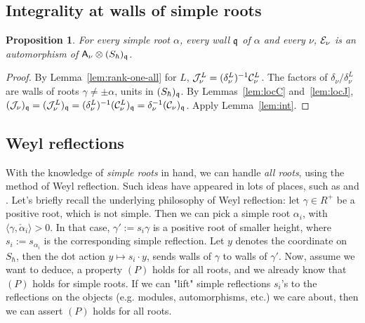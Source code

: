 \documentclass{article}
\theoremstyle{plain}
\newtheorem{proposition}[theorem]{Proposition}
\theoremstyle{definition}
\theoremstyle{remark}
\numberwithin{equation}{section}
\begin{document}
\subsection*{Integrality at walls of simple roots}
\begin{proposition}\label{prop:simple-walls}
For every simple root $\alpha$, every wall $\mathfrak q$ of $\alpha$ and every $\nu$, $\mathcal E_\nu$ is an automorphism of $\mathsf A_\nu\otimes(S_\hbar)_\mathfrak q$.
\end{proposition}

\begin{proof}
By Lemma~\ref{lem:rank-one-all} for $L$, $\mathcal J^L_\nu=(\delta^L_\nu)^{-1}\mathcal C^L_\nu$. The factors of $\delta_\nu/\delta^L_\nu$ are walls of roots $\gamma\neq\pm\alpha$, units in $(S_\hbar)_\mathfrak q$. By Lemmas~\ref{lem:locC} and~\ref{lem:locJ}, $(\mathcal J_\nu)_\mathfrak q=(\mathcal J^L_\nu)_\mathfrak q=(\delta^L_\nu)^{-1}(\mathcal C^L_\nu)_\mathfrak q=\delta_\nu^{-1}(\mathcal C_\nu)_\mathfrak q$. Apply Lemma~\ref{lem:int}.
\end{proof}

\subsection{Weyl reflections}\label{sec:disc-weyl}
With the knowledge of \emph{simple roots} in hand, we can handle \emph{all roots}, using the method of Weyl reflection. Such ideas have appeared in lots of places, such as \cite{ginzburg2014differentialoperatorsguaffine} and \cite{bezrukavnikov2026equivariantsatakecategorykostantwhittaker}. Let's briefly recall the underlying philosophy of Weyl reflection: let $\gamma \in R^+$ be a positive root, which is not simple. Then we can pick a simple root $\alpha_i$, with $\langle \gamma, \check{\alpha}_i \rangle >0$. In that case, $\gamma':= s_i \gamma$ is a positive root of smaller height, where $s_i :=s_{\alpha_i}$ is the corresponding simple reflection. Let $y$ denotes the coordinate on $S_\hbar$, then the dot action $y\mapsto s_i\cdot y$, sends walls of $\gamma$ to walls of $\gamma'$. Now, assume we want to deduce, a property $(P)$ holds for all roots, and we already know that $(P)$ holds for simple roots. If we can "lift" simple reflections $s_i$'s to the reflections on the objects (e.g. modules, automorphisms, etc.) we care about, then we can assert $(P)$ holds for all roots.
\end{document}
